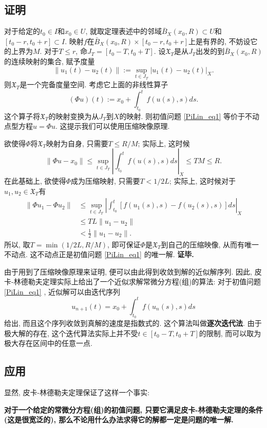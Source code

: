 \subsection{证明}
对于给定的$t_0\in I$和$x_0\in U$, 就取定理表述中的邻域$\bar B_X(x_0,R)\subset U$和$[t_0-r,t_0+r]\subset I$. 映射$f$在$\bar B_X(x_0,R)\times[t_0-r,t_0+r]$上是有界的, 不妨设它的上界为$M$. 对于$T\leq r$, 命$J_T=[t_0-T,t_0+T]$. 设$\mathfrak{X}_T$是从$J_T$出发的到$\bar B_X(x_0,R)$的连续映射的集合, 赋予度量
$$
\|u_1(t)-u_2(t)\|:=\sup_{t\in J_T}|u_1(t)-u_2(t)|_X.
$$
则$\mathfrak{X}_T$是一个完备度量空间. 考虑它上面的非线性算子
$$
(\Phi u)(t):=x_0+\int_{t_0}^tf(u(s),s)ds.
$$ 
这个算子将$\mathfrak{X}_T$的映射变换为从$J_T$到$X$的映射. 则初值问题 \autoref{PiLin_eq1} 等价于不动点型方程$u=\Phi u$. 这提示我们可以使用压缩映像原理.

欲使得$\Phi$将$\mathfrak{X}_T$映射为自身, 只需要$T\leq R/M$; 实际上, 这时候
$$
\|\Phi u-x_0\|
\leq\sup_{t\in J_T}\left|\int_{t_0}^tf(u(s),s)ds\right|_X
\leq TM\leq R.
$$
在此基础上, 欲使得$\Phi$成为压缩映射, 只需要$T<1/2L$; 实际上, 这时候对于$u_1,u_2\in\mathfrak{X}_T$有
$$
\begin{aligned}
\|\Phi u_1-\Phi u_2\|
&\leq\sup_{t\in J_T}\left|\int_{t_0}^t[f(u_1(s),s)-f(u_2(s),s)]ds\right|_X \\
&\leq TL\|u_1-u_2\|\\
&<\frac{1}{2}\|u_1-u_2\|.
\end{aligned}
$$
所以, 取$T=\min\left(1/2L,R/M\right)$, 即可保证$\Phi$是$\mathfrak{X}_T$到自己的压缩映像, 从而有唯一不动点. 这不动点正是初值问题 \autoref{PiLin_eq1} 的唯一解. \textbf{证毕.}

由于用到了压缩映像原理来证明, 便可以由此得到收敛到解的近似解序列. 因此, 皮卡-林德勒夫定理实际上给出了一个近似求解常微分方程(组)的算法: 对于初值问题 \autoref{PiLin_eq1} , 近似解可以由迭代序列
$$
u_{n+1}(t)=x_0+\int_{t_0}^tf(u_n(s),s)ds
$$
给出, 而且这个序列收敛到真解的速度是指数式的. 这个算法叫做\textbf{逐次迭代法}. 由于极大解的存在, 这个迭代算法实际上并不受$t\in [t_0-T,t_0+T]$的限制, 而可以取为极大存在区间中的任意一点.

\subsection{应用}
显然, 皮卡-林德勒夫定理保证了这样一个事实: 

\textbf{对于一个给定的常微分方程(组)的初值问题, 只要它满足皮卡-林德勒夫定理的条件(这是很宽泛的), 那么不论用什么办法求得它的解都一定是问题的唯一解.}

